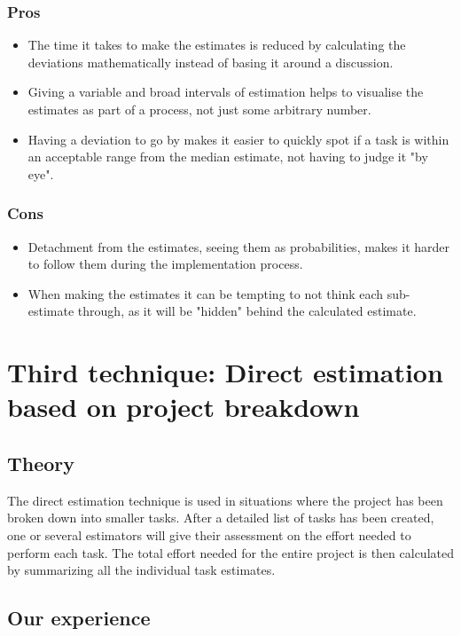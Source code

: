 \subsubsection{Pros}
\begin{itemize}
\item The time it takes to make the estimates is reduced by calculating the deviations mathematically instead of basing it around a discussion.
\item Giving a variable and broad intervals of estimation helps to visualise the estimates as part of a process, not just some arbitrary number.
\item Having a deviation to go by makes it easier to quickly spot if a task is within an acceptable range from the median estimate, not having to judge it "by eye".

\end{itemize}

\subsubsection{Cons}
\begin{itemize}
\item Detachment from the estimates, seeing them as probabilities, makes it harder to follow them during the implementation process.
\item When making the estimates it can be tempting to not think each sub-estimate through, as it will be "hidden" behind the calculated estimate.

\end{itemize}

\section{Third technique: Direct estimation based on project breakdown}
\subsection{Theory}
The direct estimation technique is used in situations where the project has been broken down into smaller tasks. After a detailed list of tasks has been created, one or several estimators will give their assessment on the effort needed to perform each task. The total effort needed for the entire project is then calculated by summarizing all the individual task estimates. 

\subsection{Our experience}

